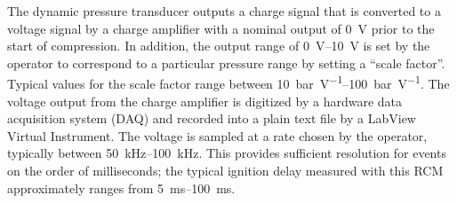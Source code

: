 \documentclass[12pt]{../ussci}
\begin{document}
The dynamic pressure transducer outputs a charge signal that is converted to a
voltage signal by a charge amplifier with a nominal output of \SI{0}{\V} prior
to the start of compression. In addition, the output range of
\SIrange{0}{10}{\V} is set by the operator to correspond to a particular
pressure range by setting a ``scale factor''. Typical values for the scale
factor range between \SIrange[range-phrase={ and }]{10}{100}{\bar\per\V}. The
voltage output from the charge amplifier is digitized by a hardware data
acquisition system (DAQ) and recorded into a plain text file by a LabView
Virtual Instrument. The voltage is sampled at a rate chosen by the operator,
typically between \SIrange[range-phrase={ and }]{50}{100}{\kHz}. This provides
sufficient resolution for events on the order of milliseconds; the typical
ignition delay measured with this RCM approximately ranges from
\SIrange{5}{100}{\ms}.
\end{document}
